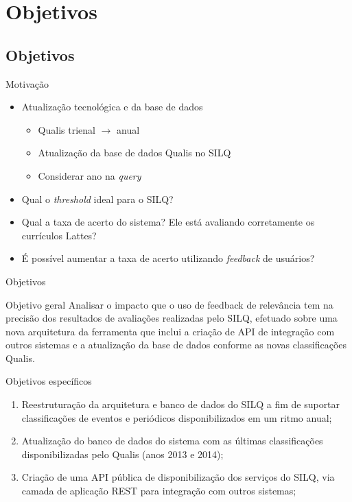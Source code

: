 \documentclass{beamer}
\begin{document}
\section{Objetivos}
\subsection*{Objetivos}

\begin{frame}{Motivação}
  \begin{itemize}
    \item Atualização tecnológica e da base de dados
    \begin{itemize}
      \item Qualis trienal $\rightarrow$ anual
      \item Atualização da base de dados Qualis no SILQ
      \item Considerar ano na \textit{query}
    \end{itemize}

    \item Qual o \textit{threshold} ideal para o SILQ?
    \item Qual a taxa de acerto do sistema? Ele está avaliando corretamente os currículos Lattes?
    \item É possível aumentar a taxa de acerto utilizando \textit{feedback} de usuários?
  \end{itemize}
\end{frame}

\begin{frame}{Objetivos}
  \begin{block}{Objetivo geral}
    Analisar o impacto que o uso de feedback de relevância tem na precisão dos resultados de avaliações realizadas pelo SILQ, efetuado sobre uma nova arquitetura da ferramenta que inclui a criação de API de integração com outros sistemas e a atualização da base de dados conforme as novas classificações Qualis.
  \end{block}
\end{frame}

\begin{frame}{Objetivos específicos}
  \begin{enumerate}[<+->]
    \item Reestruturação da arquitetura e banco de dados do SILQ a fim de suportar classificações de eventos e periódicos disponibilizados em um ritmo anual;

    \item Atualização do banco de dados do sistema com as últimas classificações disponibilizadas pelo Qualis (anos 2013 e 2014);

    \item Criação de uma API pública de disponibilização dos serviços do SILQ, via camada de aplicação REST para integração com outros sistemas;
  \end{enumerate}
\end{frame}
\end{document}
